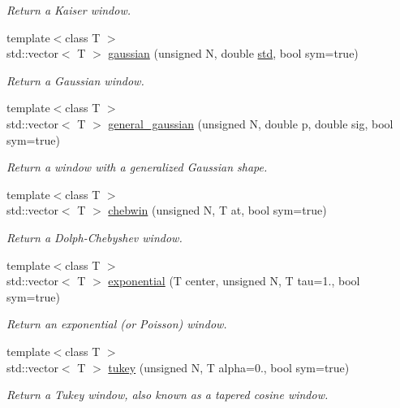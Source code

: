 \begin{DoxyCompactItemize}
\begin{DoxyCompactList}\small\item\em Return a Kaiser window. \end{DoxyCompactList}\item 
{\footnotesize template$<$class T $>$ }\\std\+::vector$<$ T $>$ \mbox{\hyperlink{namespacedsp_1_1window_a392d254078b3f6cac2415c394bff9f01}{gaussian}} (unsigned N, double \mbox{\hyperlink{namespacedsp_a940b83e360332680bb648dcfc0fc1542}{std}}, bool sym=true)
\begin{DoxyCompactList}\small\item\em Return a Gaussian window. \end{DoxyCompactList}\item 
{\footnotesize template$<$class T $>$ }\\std\+::vector$<$ T $>$ \mbox{\hyperlink{namespacedsp_1_1window_ad196fdbdcdeeac4ad1f6d35bb5b6cf44}{general\+\_\+gaussian}} (unsigned N, double p, double sig, bool sym=true)
\begin{DoxyCompactList}\small\item\em Return a window with a generalized Gaussian shape. \end{DoxyCompactList}\item 
{\footnotesize template$<$class T $>$ }\\std\+::vector$<$ T $>$ \mbox{\hyperlink{namespacedsp_1_1window_a510689dd4613dd76c1d3808ddc2a057c}{chebwin}} (unsigned N, T at, bool sym=true)
\begin{DoxyCompactList}\small\item\em Return a Dolph-\/\+Chebyshev window. \end{DoxyCompactList}\item 
{\footnotesize template$<$class T $>$ }\\std\+::vector$<$ T $>$ \mbox{\hyperlink{namespacedsp_1_1window_a2aa108b39f9af85531a2870fd0229df6}{exponential}} (T center, unsigned N, T tau=1., bool sym=true)
\begin{DoxyCompactList}\small\item\em Return an exponential (or Poisson) window. \end{DoxyCompactList}\item 
{\footnotesize template$<$class T $>$ }\\std\+::vector$<$ T $>$ \mbox{\hyperlink{namespacedsp_1_1window_afb244cc8f82873d0e8a8d25394266ecc}{tukey}} (unsigned N, T alpha=0., bool sym=true)
\begin{DoxyCompactList}\small\item\em Return a Tukey window, also known as a tapered cosine window. \end{DoxyCompactList}\item 

\end{DoxyCompactItemize}
